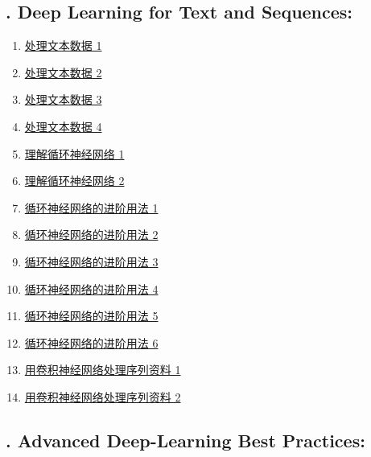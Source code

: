 \documentclass[11pt]{article}
\begin{document}
\subsection*{\small {}. Deep Learning for Text and Sequences:}

\vspace{-0.5cm}

\begin{multicols}{2}
	\begin{enumerate}
		\item \href{https://mp.weixin.qq.com/s/gcfDr3l6t5ZqEkDMcMqwcQ}{处理文本数据 1}	%
		\item \href{https://mp.weixin.qq.com/s/9YUaHAICh0Z2OxtakY7CRg}{处理文本数据 2}	%
		\item \href{https://mp.weixin.qq.com/s/eb724jE74D7IxlEKZdR19w}{处理文本数据 3}	%
		\item \href{https://mp.weixin.qq.com/s/knR99mOo74mRgrvGYCkoFQ}{处理文本数据 4}	%
		\item \href{https://mp.weixin.qq.com/s/AJdfDIG5clD-xjee_d4oMA}{理解循环神经网络 1}	%
		\item \href{https://mp.weixin.qq.com/s/OXihNZshCKdChhXzqDlDFg}{理解循环神经网络 2}	%
		\item \href{https://mp.weixin.qq.com/s/JewLh7zns2RuQSQQ0WJWhA}{循环神经网络的进阶用法 1}	%
		\item \href{https://mp.weixin.qq.com/s/nGGuUZg1ld9wPFc9hBtNfA}{循环神经网络的进阶用法 2}	%
		\item \href{https://mp.weixin.qq.com/s/Ax-suTpyVxhwAEmW-BdiCw}{循环神经网络的进阶用法 3}	%
		\item \href{https://mp.weixin.qq.com/s/ME1RtxBnfoQRyR3ND_9CfA}{循环神经网络的进阶用法 4}	%
		\item \href{https://mp.weixin.qq.com/s/zHzB06bL_uSEWhv7qbYa6g}{循环神经网络的进阶用法 5}	%
		\item \href{https://mp.weixin.qq.com/s/AE2s40A7g0P6KaNQdb-8SQ}{循环神经网络的进阶用法 6}	%
		\item \href{https://mp.weixin.qq.com/s/g-z-kbY2FxbpQnU2yDV9SA}{用卷积神经网络处理序列资料 1}	%
		\item \href{https://mp.weixin.qq.com/s/rm2TK1BZ2RhYDdHapHK01g}{用卷积神经网络处理序列资料 2}	%
	\end{enumerate}
\end{multicols}

\subsection*{\small {}. Advanced Deep-Learning Best Practices:}
\end{document}

